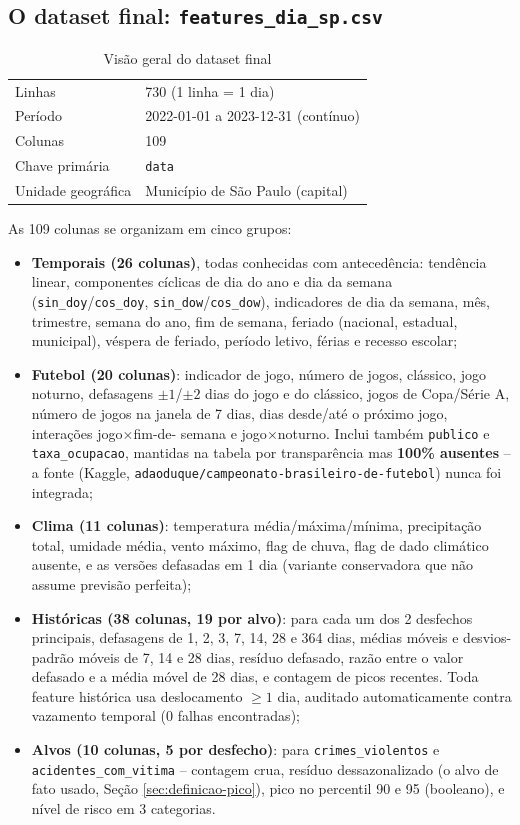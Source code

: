 \documentclass[12pt]{article}
\begin{document}
\subsection{O dataset final: \texttt{features\_dia\_sp.csv}}

\begin{table}[ht]
\centering
\caption{Visão geral do dataset final}
\small
\begin{tabular}{@{}ll@{}}
\toprule
Linhas & 730 (1 linha = 1 dia) \\
Período & 2022-01-01 a 2023-12-31 (contínuo) \\
Colunas & 109 \\
Chave primária & \texttt{data} \\
Unidade geográfica & Município de São Paulo (capital) \\
\bottomrule
\end{tabular}
\end{table}

As 109 colunas se organizam em cinco grupos:

\begin{itemize}
  \item \textbf{Temporais (26 colunas)}, todas conhecidas com
  antecedência: tendência linear, componentes cíclicas de dia do ano e
  dia da semana (\texttt{sin\_doy}/\texttt{cos\_doy},
  \texttt{sin\_dow}/\texttt{cos\_dow}), indicadores de dia da semana,
  mês, trimestre, semana do ano, fim de semana, feriado (nacional,
  estadual, municipal), véspera de feriado, período letivo, férias e
  recesso escolar;
  \item \textbf{Futebol (20 colunas)}: indicador de jogo, número de
  jogos, clássico, jogo noturno, defasagens $\pm1$/$\pm2$ dias do jogo e
  do clássico, jogos de Copa/Série A, número de jogos na janela de 7
  dias, dias desde/até o próximo jogo, interações jogo$\times$fim-de-
  semana e jogo$\times$noturno. Inclui também \texttt{publico} e
  \texttt{taxa\_ocupacao}, mantidas na tabela por transparência mas
  \textbf{100\% ausentes} -- a fonte (Kaggle,
  \texttt{adaoduque/campeonato-brasileiro-de-futebol}) nunca foi
  integrada;
  \item \textbf{Clima (11 colunas)}: temperatura média/máxima/mínima,
  precipitação total, umidade média, vento máximo, flag de chuva, flag
  de dado climático ausente, e as versões defasadas em 1 dia (variante
  conservadora que não assume previsão perfeita);
  \item \textbf{Históricas (38 colunas, 19 por alvo)}: para cada um dos
  2 desfechos principais, defasagens de 1, 2, 3, 7, 14, 28 e 364 dias,
  médias móveis e desvios-padrão móveis de 7, 14 e 28 dias, resíduo
  defasado, razão entre o valor defasado e a média móvel de 28 dias, e
  contagem de picos recentes. Toda feature histórica usa deslocamento
  $\geq 1$ dia, auditado automaticamente contra vazamento temporal (0
  falhas encontradas);
  \item \textbf{Alvos (10 colunas, 5 por desfecho)}: para
  \texttt{crimes\_violentos} e \texttt{acidentes\_com\_vitima} --
  contagem crua, resíduo dessazonalizado (o alvo de fato usado, Seção
  \ref{sec:definicao-pico}), pico no percentil 90 e 95 (booleano), e
  nível de risco em 3 categorias.
\end{itemize}
\end{document}
